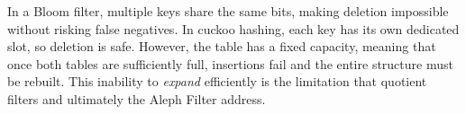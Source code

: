 \begin{insightbox}
In a Bloom filter, multiple keys share the same bits, making deletion 
impossible without risking false negatives. In cuckoo hashing, each key 
has its own dedicated slot, so deletion is safe. However, the table has 
a fixed capacity, meaning that once both tables are sufficiently full, insertions 
fail and the entire structure must be rebuilt. This inability to 
\emph{expand} efficiently is the limitation that quotient filters and 
ultimately the Aleph Filter address.
\end{insightbox}

